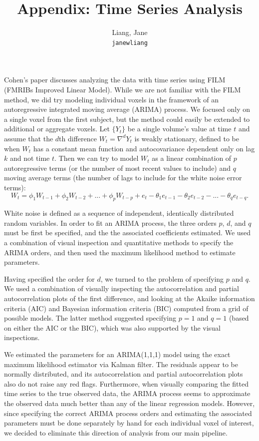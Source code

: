 \documentclass[11pt]{article}
\title{Appendix: Time Series Analysis}
\author{
  Liang, Jane\\
  \texttt{janewliang}
}
\begin{document}
\maketitle

\par \indent Cohen's paper \cite{CohenSelfControl} discusses analyzing the 
data with time series using FILM (FMRIBs Improved Linear Model). While we are 
not familiar with the FILM method, we did try modeling individual voxels in 
the framework of an autoregressive integrated moving average (ARIMA) process. 
We focused only on a single voxel from the first subject, but the method 
could easily be extended to additional or aggregate voxels. Let $\{Y_t\}$ be 
a single volume's value at time $t$ and assume that the $d$th difference 
$W_t = \nabla^d Y_t$ is weakly stationary, defined to be when $W_t$ has a 
constant mean function and autocovariance dependent only on lag $k$ and not 
time $t$. Then we can try to model $W_t$ as a linear combination of $p$ 
autoregressive terms (or the number of most recent values to include) and $q$ 
moving average terms (the number of lags to include for the white noise error 
terms): 
$$W_t = \phi_1 W_{t-1} + \phi_2 W_{t-2} + ... + \phi_p W_{t-p} + e_t - 
\theta_1 e_{t-1} - \theta_2 e_{t-2} - ... - \theta_q e_{t-q}.$$

\par White noise is defined as a sequence of independent, identically 
distributed random variables. In order to fit an ARIMA process, the three 
orders $p$, $d$, and $q$ must be first be specified, and the the associated 
coefficients estimated. We used a combination of visual inspection and 
quantitative methods to specify the ARIMA orders, and then used the maximum 
likelihood method to estimate parameters. 

\par Having specified the order for $d$, we turned to the problem of 
specifying $p$ and $q$. We used a combination of visually inspecting the 
autocorrelation and partial autocorrelation plots of the first difference, 
and looking at the Akaike information criteria (AIC) and Bayesian information 
criteria (BIC) computed from a grid of possible models. The latter method 
suggested specifying $p=1$ and $q=1$ (based on either the AIC or the BIC), 
which was also supported by the visual inspections. 

\par We estimated the parameters for an ARIMA(1,1,1) model using the exact 
maximum likelihood estimator via Kalman filter. The residuals appear to be 
normally distributed, and its autocorrelation and partial autocorrelation 
plots also do not raise any red flags. Furthermore, when visually comparing 
the fitted time series to the true observed data, the ARIMA process seems to 
approximate the observed data much better than any of the linear regression 
models. However, since specifying the correct ARIMA process orders and 
estimating the associated parameters must be done separately by hand for 
each individual voxel of interest, we decided to eliminate this direction 
of analysis from our main pipeline. 
\end{document}
